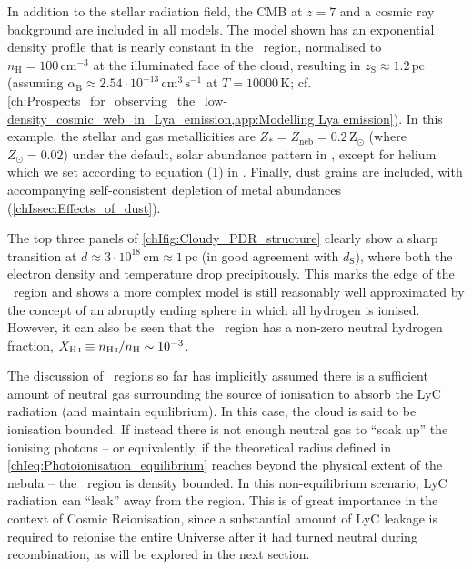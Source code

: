 In addition to the stellar radiation field, the CMB at $z = 7$ and a cosmic ray background are included in all models. The model shown has an exponential density profile that is nearly constant in the \HII\ region, normalised to $n_\text{H} = 100 \, \mathrm{cm^{-3}}$ at the illuminated face of the cloud, resulting in $z_\text{S} \approx 1.2 \, \mathrm{pc}$ (assuming $\alpha_\text{B} \approx 2.54 \cdot 10^{-13} \, \mathrm{cm^{3} \, s^{-1}}$ at $T = \num{10000} \, \mathrm{K}$; cf. \cref{ch:Prospects_for_observing_the_low-density_cosmic_web_in_Lya_emission,app:Modelling Lya emission}). In this example, the stellar and gas metallicities are $Z_* = Z_\text{neb} = 0.2 \, \mathrm{Z_\odot}$ (where $Z_\odot = 0.02$) under the default, solar abundance pattern in , except for helium which we set according to equation (1) in \citet{2004ApJS..153...75G}. Finally, dust grains are included, with accompanying self-consistent depletion of metal abundances (\cref{chIssec:Effects_of_dust}).

The top three panels of \cref{chIfig:Cloudy_PDR_structure} clearly show a sharp transition at $d \approx 3 \cdot 10^{18} \, \mathrm{cm} \approx 1 \, \mathrm{pc}$ (in good agreement with $d_\text{S}$), where both the electron density and temperature drop precipitously. This marks the edge of the \HII\ region and shows a more complex model is still reasonably well approximated by the concept of an abruptly ending \citeauthor{1939ApJ....89..526S} sphere in which all hydrogen is ionised. However, it can also be seen that the \HII\ region has a non-zero neutral hydrogen fraction, $X_\text{\ion{H}{I}} \equiv n_\text{\ion{H}{I}}/n_\text{H} \sim 10^{-3}$.

The discussion of \HII\ regions so far has implicitly assumed there is a sufficient amount of neutral gas surrounding the source of ionisation to absorb the LyC radiation (and maintain equilibrium). In this case, the cloud is said to be ionisation bounded. If instead there is not enough neutral gas to ``soak up'' the ionising photons -- or equivalently, if the theoretical \citeauthor{1939ApJ....89..526S} radius defined in \cref{chIeq:Photoionisation_equilibrium} reaches beyond the physical extent of the nebula -- the \HII\ region is density bounded. In this non-equilibrium scenario, LyC radiation can ``leak'' away from the region. This is of great importance in the context of Cosmic Reionisation, since a substantial amount of LyC leakage is required to reionise the entire Universe after it had turned neutral during recombination, as will be explored in the next section.

